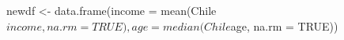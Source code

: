 \begin{Schunk}
\begin{Sinput}
 newdf <- data.frame(income = mean(Chile$income, na.rm=TRUE), age=median(Chile$age, na.rm = TRUE))
\end{Sinput}
\end{Schunk}
